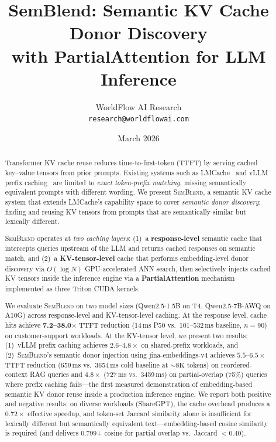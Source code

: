 \documentclass[11pt,twocolumn]{article}
\title{\textbf{SemBlend: Semantic KV Cache Donor Discovery\\
with PartialAttention for LLM Inference}}
\author{
  WorldFlow AI Research\\
  \texttt{research@worldflowai.com}
}
\date{March 2026}
\newcommand{\semblend}{\textsc{SemBlend}\xspace}
\begin{document}
\maketitle

\begin{abstract}
Transformer KV cache reuse reduces time-to-first-token (TTFT) by
serving cached key--value tensors from prior prompts. Existing systems
such as LMCache~\cite{lmcache} and vLLM prefix caching~\cite{vllm}
are limited to \emph{exact token-prefix matching}, missing
semantically equivalent prompts with different wording.
We present \semblend, a semantic KV cache system that extends LMCache's
capability space to cover \emph{semantic donor discovery}: finding and
reusing KV tensors from prompts that are semantically similar but
lexically different.

\semblend operates at \emph{two caching layers}:
(1)~a \textbf{response-level} semantic cache that intercepts queries
upstream of the LLM and returns cached responses on semantic match, and
(2)~a \textbf{KV-tensor-level} cache that performs embedding-level
donor discovery via $O(\log N)$ GPU-accelerated ANN search, then
selectively injects cached KV tensors inside the inference engine via
a \textbf{PartialAttention} mechanism implemented as three Triton CUDA
kernels.

We evaluate \semblend on two model sizes (Qwen2.5-1.5B on T4,
Qwen2.5-7B-AWQ on A10G) across response-level and KV-tensor-level
caching. At the response level, cache hits achieve
\textbf{7.2--38.0$\times$} TTFT reduction (14\,ms P50 vs.\
101--532\,ms baseline, $n{=}90$) on customer-support workloads.
At the KV-tensor level, we present two results: (1)~vLLM prefix
caching achieves $\mathbf{2.6\text{--}4.8\times}$ on shared-prefix
workloads, and (2)~\semblend's semantic donor injection using
jina-embeddings-v4 achieves $\mathbf{5.5\text{--}6.5\times}$ TTFT
reduction (659\,ms vs.\ 3654\,ms cold baseline at
${\sim}8\text{K}$ tokens) on reordered-context RAG queries and
$\mathbf{4.8\times}$ (727\,ms vs.\ 3459\,ms) on partial-overlap
(75\%) queries where prefix caching fails---the first measured
demonstration of embedding-based semantic KV donor reuse inside a
production inference engine.
We report both positive and negative results: on diverse workloads
(ShareGPT), the cache overhead produces a $0.72\times$ effective
speedup, and token-set Jaccard similarity alone is insufficient for
lexically different but semantically equivalent text---embedding-based
cosine similarity is required (and delivers $0.799$+ cosine for
partial overlap vs.\ Jaccard $<0.40$).
\end{abstract}
\end{document}
